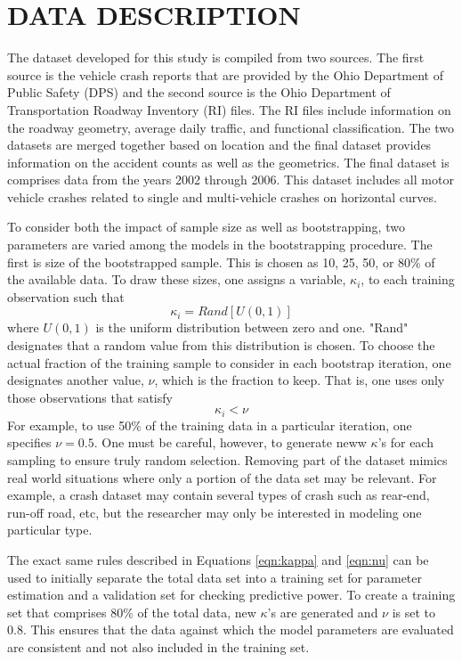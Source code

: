 \documentclass[titlepage,12pt,times,nopageno]{article}
\begin{document}
\section*{\label{sec:data}\normalsize DATA DESCRIPTION}
The dataset developed for this study is compiled from two sources.  The first source is the vehicle crash reports that are provided by the Ohio Department of Public Safety (DPS) and the second source is the Ohio Department of Transportation Roadway Inventory (RI) files.  The RI files include information on the roadway geometry, average daily traffic, and functional classification.  The two datasets are merged together based on location and the final dataset provides information on the accident counts as well as the geometrics.  The final dataset is comprises data from the years 2002 through 2006.  This dataset includes all motor vehicle crashes related to single and multi-vehicle crashes on horizontal curves.\par
To consider both the impact of sample size as well as bootstrapping, two parameters are varied among the models in the bootstrapping procedure.  The first is size of the bootstrapped sample.  This is chosen as 10, 25, 50, or 80\% of the available data.  To draw these sizes, one assigns a variable, $\kappa_i$, to each training observation such that
\begin{equation}
\kappa_i=Rand[U(0,1)] \label{eqn:kappa}
\end{equation}
where $U(0,1)$ is the uniform distribution between zero and one. "Rand" designates that a random value from this distribution is chosen.  To choose the actual fraction of the training sample to consider in each bootstrap iteration, one designates another value, $\nu$, which is the fraction to keep.  That is, one uses only those observations that satisfy
\begin{equation}
\kappa_i<\nu \label{eqn:nu}
\end{equation}
For example, to use 50\% of the training data in a particular iteration, one specifies $\nu=0.5$.  One must be careful, however, to generate neww $\kappa$'s for each sampling to ensure truly random selection.  Removing part of the dataset mimics real world situations where only a portion of the data set may be relevant.  For example, a crash dataset may contain several types of crash such as rear-end, run-off road, etc, but the researcher may only be interested in modeling one particular type.\par
The exact same rules described in Equations \ref{eqn:kappa} and \ref{eqn:nu} can be used to initially separate the total data set into a training set for parameter estimation and a validation set for checking predictive power.  To create a training set that comprises 80\% of the total data, new $\kappa$'s are generated and $\nu$ is set to 0.8.  This ensures that the data against which the model parameters are evaluated are consistent and not also included in the training set.\par
\end{document}
